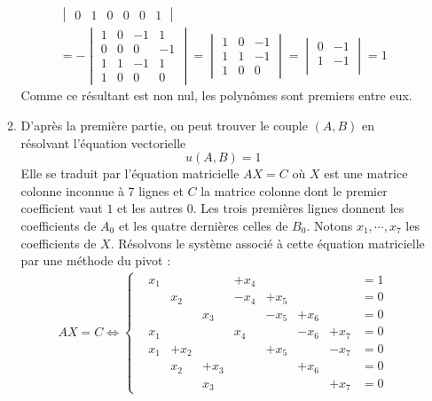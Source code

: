 \begin{enumerate}
\begin{enumerate}
\begin{multline*}
\begin{vmatrix}
 0 & 1 & 0  & 0  & 0  & 1
 \end{vmatrix}\\
= -
 \begin{vmatrix}
 1 & 0  & -1 & 1   \\
 0 & 0  & 0  & -1  \\
 1 & 1  & -1 & 1   \\
 1 & 0  & 0  & 0  
 \end{vmatrix}
=
 \begin{vmatrix}
 1 & 0  & -1  \\
 1 & 1  & -1  \\
 1 & 0  & 0   
 \end{vmatrix}
=
 \begin{vmatrix}
0  & -1  \\
1  & -1  \\
 \end{vmatrix} = 1
\end{multline*}
Comme ce résultant est non nul, les polynômes sont premiers entre eux.
 \item D'après la première partie, on peut trouver le couple $(A,B)$ en résolvant l'équation vectorielle
\begin{displaymath}
 u(A,B)=1
\end{displaymath}
Elle se traduit par l'équation matricielle $AX=C$ où $X$ est une matrice colonne inconnue à 7 lignes et $C$ la matrice colonne dont le premier coefficient vaut $1$ et les autres $0$.\newline
Les trois premières lignes donnent les coefficients de $A_0$ et les quatre dernières celles de $B_0$. Notons $x_1,\cdots, x_7$ les coefficients de $X$.\newline
Résolvons le système associé à cette équation matricielle par une méthode du pivot :
\begin{multline*}
AX = C  
\Leftrightarrow
 \left\lbrace 
\begin{aligned}
 &x_1 &     &     &+x_4 &     &     &     &= 1\\ 
 &    &x_2  &     &-x_4 &+x_5 &     &     &= 0\\
 &    &     &x_3  &     &-x_5 &+x_6 &     &= 0\\
 &x_1 &     &     &x_4  &     &-x_6 &+x_7 &= 0\\
 &x_1 &+x_2 &     &     &+x_5 &     &-x_7 &= 0\\
 &    &x_2  &+x_3 &     &     &+x_6 &     &= 0\\
 &    &     &x_3  &     &     &     &+x_7 &= 0
\end{aligned}

\end{multline*}
\end{enumerate}
\end{enumerate}
